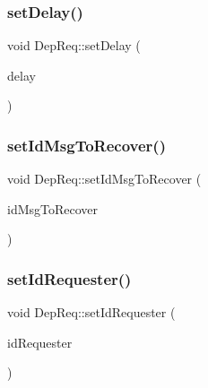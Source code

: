\mbox{\label{class_dep_req_a90ae52243ec735ebf15bdf3e8467b393}} 
\subsubsection{\texorpdfstring{set\+Delay()}{setDelay()}}
{\footnotesize\ttfamily void Dep\+Req\+::set\+Delay (\begin{DoxyParamCaption}\item[{const \hyperlink{dep_req__m_8h_ae16a4057335e3a89fda3f6019868733b}{dep\+Req\+Time} \&}]{delay }\end{DoxyParamCaption})\hspace{0.3cm}{\ttfamily [virtual]}}

\mbox{\label{class_dep_req_a488a57f56c5fc87aae853a2b3e469fd0}} 
\subsubsection{\texorpdfstring{set\+Id\+Msg\+To\+Recover()}{setIdMsgToRecover()}}
{\footnotesize\ttfamily void Dep\+Req\+::set\+Id\+Msg\+To\+Recover (\begin{DoxyParamCaption}\item[{const \hyperlink{dep_req__m_8h_a2bbb71ed0e9660ec02d81471eafd9c29}{id\+Msg\+Dep\+Req} \&}]{id\+Msg\+To\+Recover }\end{DoxyParamCaption})\hspace{0.3cm}{\ttfamily [virtual]}}

\mbox{\label{class_dep_req_a27f6e58ad8dcf4902de1042322a3e6e7}} 
\subsubsection{\texorpdfstring{set\+Id\+Requester()}{setIdRequester()}}
{\footnotesize\ttfamily void Dep\+Req\+::set\+Id\+Requester (\begin{DoxyParamCaption}\item[{unsigned int}]{id\+Requester }\end{DoxyParamCaption})\hspace{0.3cm}{\ttfamily [virtual]}}



